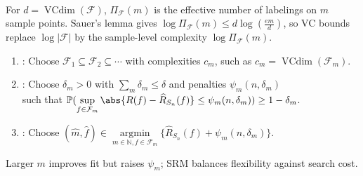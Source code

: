 \begin{remark} \label{rem:sl-growth-functions} \\
For $d=\operatorname{VCdim}(\mathcal{F})$, $\Pi_{\mathcal{F}}(m)$ is the effective number of labelings on $m$ sample points. Sauer's lemma gives $\log\Pi_{\mathcal{F}}(m)\leq d\log\left(\frac{em}{d}\right)$, so VC bounds replace $\log|\mathcal{F}|$ by the sample-level complexity $\log\Pi_{\mathcal{F}}(m)$.
\end{remark}

\begin{method} \label{meth:sl-structural-risk-minimization} 
\begin{enumerate}[label=(\roman*)]
\setlength{\itemsep}{0pt}
\item {}: Choose $\mathcal{F}_1\subseteq\mathcal{F}_2\subseteq\cdots$ with complexities $c_m$, such as $c_m=\operatorname{VCdim}(\mathcal{F}_m)$.
\item {}: Choose $\delta_m>0$ with $\sum\limits_m\delta_m\leq\delta$ and penalties $\psi_m(n,\delta_m)$\\
such that $\mathbb{P}(\sup\limits_{f\in\mathcal{F}_m}\abs{R(f)-\widehat{R}_{S_n}(f)}\leq\psi_m(n,\delta_m))\geq1-\delta_m$.
\item {}: Choose $(\widehat{m},\widehat{f})\in\operatorname*{argmin}\limits_{m\in\mathbb{N},f\in\mathcal{F}_m}\{\widehat{R}_{S_n}(f)+\psi_m(n,\delta_m)\}$.
\end{enumerate}
Larger $m$ improves fit but raises $\psi_m$; SRM balances flexibility against search cost.
\end{method}
